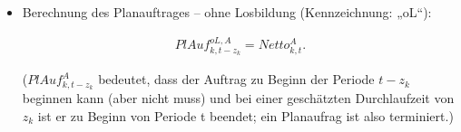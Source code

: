 \begin{algorithmic}
\begin{itemize} [leftmargin=*]
\begin{enumerate} [leftmargin=1.5em, label=]
\begin{enumerate} [leftmargin=*, label= \arabic*.]
\begin{itemize} [leftmargin=*]
                    \item Berechnung des Planauftrages -- ohne Losbildung (Kennzeichnung: „oL“):
                    
                    \begin{fleqn}
                        \begin{align*}
                        PlAuf^{oL,A}_{k,t - z_{k}} = Netto^{A}_{k,t}\text{.}
                        \end{align*}
                    \end{fleqn}
                    ($PlAuf^{A}_{k,t - z_{k}}$ bedeutet, dass der Auftrag zu Beginn der Periode $t - z_{k}$ beginnen kann (aber nicht muss) und bei einer geschätzten Durchlaufzeit von $z_{k}$ ist er zu Beginn von Periode t beendet; ein Planaufrag ist also terminiert.)	\\
                    
                \end{itemize}
                

\end{enumerate}
\end{enumerate}
\end{itemize}
\end{algorithmic}
